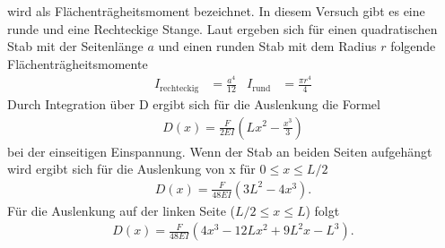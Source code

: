 wird als Flächenträgheitsmoment bezeichnet.
In diesem Versuch gibt es eine runde und eine Rechteckige Stange.
Laut \cite{uni_siegen} ergeben sich für einen quadratischen Stab mit der Seitenlänge $a$ und einen runden Stab mit dem Radius $r$ folgende Flächenträgheitsmomente
\begin{align}
    I_\text{rechteckig} &= \frac{a^4}{12} & I_\text{rund} &= \frac{\pi r^4}{4}
    \label{eq:Flachentragheitsmomente}
\end{align}
%
Durch Integration über D ergibt sich für die Auslenkung die Formel
\begin{align}
    D(x) = \frac{F}{2 E I} \left(L x^2 - \frac{x^3}{3} \right)
    \label{eq:D_x_einseitig}
\end{align}
bei der einseitigen Einspannung.
Wenn der Stab an beiden Seiten aufgehängt wird ergibt sich für die Auslenkung von x für
$0 \leq x \leq L/2$
\begin{align}
    D(x) = \frac{F}{48 E I} \left(3 L^2- 4 x^3\right).
    \label{eq:D_x_rechts}
\end{align}
Für die Auslenkung auf der linken Seite ($L/2 \leq x \leq L $) folgt
\begin{align}
    D(x) = \frac{F}{48 E I} \left(4x^3 - 12L x^2 + 9L^2 x - L^3 \right). 
    \label{eq:D_x_beidseitig_links}
\end{align}